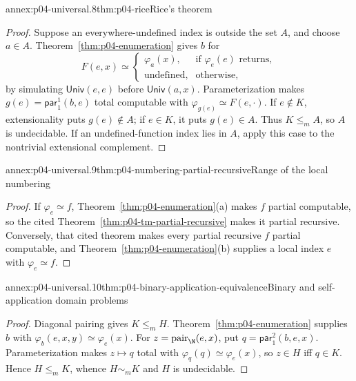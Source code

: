 \begin{annexitem}{annex:p04-universal.8}{thm:p04-rice}{Rice's theorem}
\begin{proof}
Suppose an everywhere-undefined index is outside the set \(A\),
and choose \(a\in A\).
Theorem~\ref{thm:p04-enumeration} gives \(b\) for
\[
 F(e,x)\simeq
 \begin{cases}
   \varphi_a(x),&\text{if }\varphi_e(e)\text{ returns},\\
   \text{undefined},&\text{otherwise},
 \end{cases}
\]
by simulating \(\mathsf{Univ}(e,e)\) before \(\mathsf{Univ}(a,x)\).
Parameterization makes
\(g(e)=\mathsf{par}_1^1(b,e)\) total computable with
\(\varphi_{g(e)}\simeq F(e,\cdot)\).  If \(e\notin K\), extensionality puts
\(g(e)\notin A\); if \(e\in K\), it puts \(g(e)\in A\).  Thus
\(K\leq_m A\), so \(A\) is undecidable.  If an undefined-function index lies
in \(A\), apply this case to the nontrivial extensional complement.
\end{proof}
\end{annexitem}

\begin{annexitem}{annex:p04-universal.9}{thm:p04-numbering-partial-recursive}{Range of the local numbering}
\begin{proof}
If \(\varphi_e\simeq f\), Theorem~\ref{thm:p04-enumeration}(a) makes \(f\)
partial computable, so the cited Theorem~\ref{thm:p04-tm-partial-recursive}
makes it partial recursive.  Conversely, that cited theorem makes every
partial recursive \(f\) partial computable, and
Theorem~\ref{thm:p04-enumeration}(b) supplies a local index \(e\) with
\(\varphi_e\simeq f\).
\end{proof}
\end{annexitem}

\begin{annexitem}{annex:p04-universal.10}{thm:p04-binary-application-equivalence}{Binary and self-application domain problems}
\begin{proof}
Diagonal pairing gives \(K\leq_mH\).  Theorem~\ref{thm:p04-enumeration}
supplies \(b\) with \(\varphi_b(e,x,y)\simeq\varphi_e(x)\).  For
\(z=\operatorname{pair}_{\N}(e,x)\), put \(q=\mathsf{par}_1^2(b,e,x)\).
Parameterization makes \(z\mapsto q\) total with
\(\varphi_q(q)\simeq\varphi_e(x)\), so \(z\in H\) iff \(q\in K\).  Hence
\(H\leq_mK\), whence \(H\sim_mK\) and \(H\) is undecidable.
\end{proof}
\end{annexitem}
